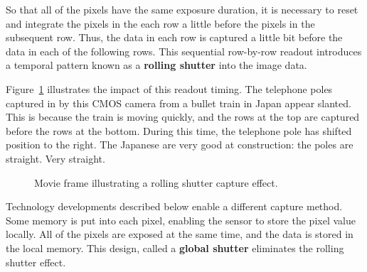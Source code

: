 \documentclass[
  letterpaper,
]{book}
\begin{document}
So that all of the pixels have the same exposure duration, it is
necessary to reset and integrate the pixels in the each row a little
before the pixels in the subsequent row. Thus, the data in each row is
captured a little bit before the data in each of the following rows.
This sequential row-by-row readout introduces a temporal pattern known
as a \textbf{rolling shutter} into the image data.

Figure~\ref{fig-rolling-shutter} illustrates the impact of this readout
timing. The telephone poles captured in by this CMOS camera from a
bullet train in Japan appear slanted. This is because the train is
moving quickly, and the rows at the top are captured before the rows at
the bottom. During this time, the telephone pole has shifted position to
the right. The Japanese are very good at construction: the poles are
straight. Very straight.

\begin{figure}


\caption{\label{fig-rolling-shutter}Movie frame illustrating a rolling
shutter capture effect.}

\end{figure}%

Technology developments described below enable a different capture
method. Some memory is put into each pixel, enabling the sensor to store
the pixel value locally. All of the pixels are exposed at the same time,
and the data is stored in the local memory. This design, called a
\label{def-global-shutter}{\textbf{global shutter}}
eliminates the rolling shutter effect.
\end{document}

